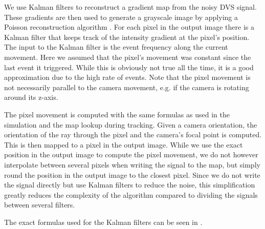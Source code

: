 We use Kalman filters to reconstruct a gradient map from the noisy DVS signal.
These gradients are then used to generate a grayscale image by applying a
Poisson reconstruction algorithm \cite{raskarpoisson}. For each pixel in the
output image there is a Kalman filter that keeps track of the intensity gradient at
the pixel's position. The input to the Kalman filter is the event frequency
along the current movement. Here we assumed that the pixel's
movement was constant since the last event it triggered. While this is
obviously not true all the time, it is a good approximation due to the high
rate of events. Note that the pixel movement is not necessarily parallel to the
camera movement, e.g. if the camera is rotating around its z-axis.

The pixel movement is computed with the same formulas as used in the
simulation and the map lookup during tracking. Given a camera orientation, the
orientation of the ray through the pixel and the camera's focal point is
computed. This is then mapped to a pixel in the output image. While we use the
exact position in the output image to compute the pixel movement,  we do not
however interpolate between several pixels when writing the signal to the map,
but simply round the position in the output image to the closest pixel. Since
we do not write the signal directly but use Kalman filters to reduce the noise,
this simplification greatly reduces the complexity of the algorithm compared to
dividing the signals between several filters.

The exact formulas used for the Kalman filters can be seen in
\cite{kim2014simultaneous}.
